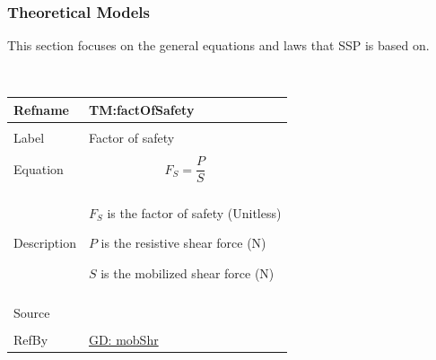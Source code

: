 \documentclass[12pt]{article}
\begin{document}
\subsubsection{Theoretical Models}
\label{Sec:TMs}
This section focuses on the general equations and laws that SSP is based on.
\par~

\noindent \begin{minipage}{\textwidth}
          \begin{tabular}{>{\raggedright}p{}>{\raggedright\arraybackslash}p{}}
          \toprule \textbf{Refname} & \textbf{TM:factOfSafety}
          \label{TM:factOfSafety}
          \\ \midrule \\
          Label & Factor of safety
          \\ \midrule \\
          Equation & \begin{displaymath}
                     {F_{S}}=\frac{P}{S}
                     \end{displaymath}
          \\ \midrule \\
          Description & \begin{symbDescription}
                        \item{${F_{S}}$ is the factor of safety (Unitless)}
                        \item{$P$ is the resistive shear force (N)}
                        \item{$S$ is the mobilized shear force (N)}
                        \end{symbDescription}
          \\ \midrule \\
          Source & \cite{fredlund1977}
          \\ \midrule \\
          RefBy & \hyperref[GD:mobShr]{GD: mobShr}
          \\ \bottomrule
          \end{tabular}
          \end{minipage}
\par~
\end{document}
